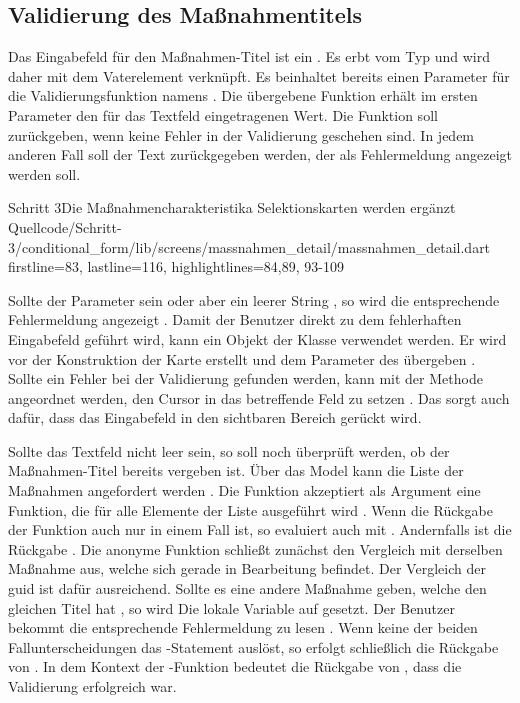 \subsection{Validierung des Maßnahmentitels}

Das Eingabefeld für den Maßnahmen-Titel ist ein  .
Es erbt vom Typ  und wird daher mit dem Vaterelement  verknüpft.
Es beinhaltet bereits einen Parameter für die Validierungsfunktion namens  .
Die übergebene Funktion erhält im ersten Parameter den für das Textfeld eingetragenen Wert.
Die Funktion soll  zurückgeben, wenn keine Fehler in der Validierung geschehen sind.
In jedem anderen Fall soll der Text zurückgegeben werden, der als Fehlermeldung angezeigt werden soll.

\begin{alexlisting}{Schritt 3}{Die Maßnahmencharakteristika Selektionskarten werden ergänzt}
    {Quellcode/Schritt-3/conditional_form/lib/screens/massnahmen_detail/massnahmen_detail.dart}
    {firstline=83, lastline=116, highlightlines={84,89, 93-109}}
    \label{lst:Schritt3createMassnahmenTitelTextFormFieldValidator}
\end{alexlisting}

Sollte der Parameter  sein oder aber ein leerer String , so wird die entsprechende Fehlermeldung  angezeigt .
Damit der Benutzer direkt zu dem fehlerhaften Eingabefeld geführt wird, kann ein Objekt der Klasse  verwendet werden.
Er wird vor der Konstruktion der Karte erstellt  und dem Parameter  des  übergeben .
Sollte ein Fehler bei der Validierung gefunden werden, kann mit der Methode  angeordnet werden, den Cursor in das betreffende Feld zu setzen .
Das sorgt auch dafür, dass das Eingabefeld in den sichtbaren Bereich gerückt wird.

Sollte das Textfeld nicht leer sein, so soll noch überprüft werden, ob der Maßnahmen-Titel bereits vergeben ist.
Über das Model kann die Liste der Maßnahmen angefordert werden .
Die Funktion  akzeptiert als Argument eine Funktion, die für alle Elemente der Liste ausgeführt wird .
Wenn die Rückgabe der Funktion auch nur in einem Fall  ist, so evaluiert auch  mit .
Andernfalls ist die Rückgabe . 
Die anonyme Funktion schließt zunächst den Vergleich mit derselben Maßnahme aus, welche sich gerade in Bearbeitung befindet.
Der Vergleich der guid ist dafür ausreichend.
Sollte es eine andere Maßnahme geben, welche den gleichen Titel hat , so wird Die lokale Variable  auf  gesetzt.
Der Benutzer bekommt die entsprechende Fehlermeldung  zu lesen .
Wenn keine der beiden Fallunterscheidungen das -Statement  auslöst, so erfolgt schließlich die Rückgabe von .
In dem Kontext der -Funktion bedeutet die Rückgabe von  , dass die Validierung erfolgreich war.
 

